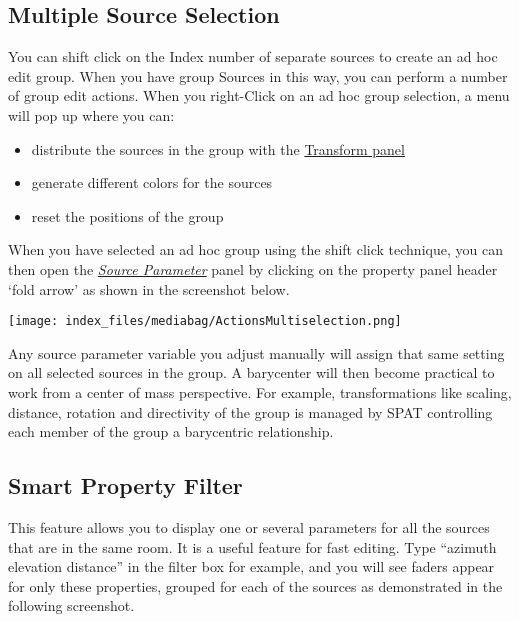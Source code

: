 \documentclass[
  letterpaper,
  DIV=11,
  numbers=noendperiod]{scrreport}
\providecommand{\tightlist}{%
  \setlength{\itemsep}{0pt}\setlength{\parskip}{0pt}}\usepackage{longtable,booktabs,array}
\begin{document}
\hypertarget{multiple-source-selection}{%
\subsection{Multiple Source Selection}\label{multiple-source-selection}}

You can shift click on the Index number of separate sources to create an
ad hoc edit group. When you have group Sources in this way, you can
perform a number of group edit actions. When you right-Click on an ad
hoc group selection, a menu will pop up where you can:

\begin{itemize}
\tightlist
\item
  distribute the sources in the group with the
  \href{Spat_Environment_Transformation.md}{Transform panel}
\item
  generate different colors for the sources
\item
  reset the positions of the group
\end{itemize}

When you have selected an ad hoc group using the shift click technique,
you can then open the
\emph{\href{Spat_Environment_Source_Parameters.md}{Source Parameter}}
panel by clicking on the property panel header `fold arrow' as shown in
the screenshot below.

\texttt{[image: index\_files/mediabag/ActionsMultiselection.png]}

Any source parameter variable you adjust manually will assign that same
setting on all selected sources in the group. A barycenter will then
become practical to work from a center of mass perspective. For example,
transformations like scaling, distance, rotation and directivity of the
group is managed by SPAT controlling each member of the group a
barycentric relationship.

\hypertarget{smart-property-filter}{%
\subsection{Smart Property Filter}\label{smart-property-filter}}

This feature allows you to display one or several parameters for all the
sources that are in the same room. It is a useful feature for fast
editing. Type ``azimuth elevation distance'' in the filter box for
example, and you will see faders appear for only these properties,
grouped for each of the sources as demonstrated in the following
screenshot.
\end{document}
